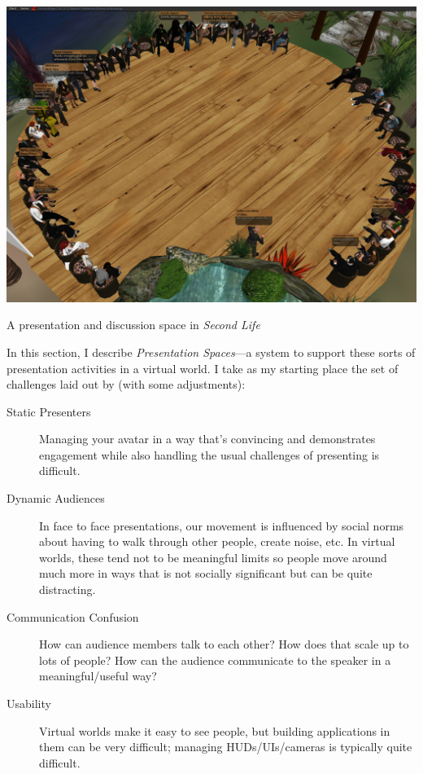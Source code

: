 \begin{marginfigure}
	\includegraphics{figures/presentation_2.png}
	\caption{A presentation and discussion space in \emph{Second Life}}
	\label{fig:circle_presentation}
\end{marginfigure}

In this section, I describe \emph{Presentation Spaces}---a system to support these sorts of presentation activities in a virtual world. I take as my starting place the set of challenges laid out by \citet{Yankelovich:2008vk} (with some adjustments):

\begin{description}
\item[Static Presenters]{Managing your avatar in a way that's convincing and demonstrates engagement while also handling the usual challenges of presenting is difficult.}
\item[Dynamic Audiences]{In face to face presentations, our movement is influenced by social norms about having to walk through other people, create noise, etc. In virtual worlds, these tend not to be meaningful limits so people move around much more in ways that is not socially significant but can be quite distracting.}
\item[Communication Confusion]{How can audience members talk to each other? How does that scale up to lots of people? How can the audience communicate to the speaker in a meaningful/useful way?}
\item[Usability]{Virtual worlds make it easy to see people, but building applications in them can be very difficult; managing HUDs/UIs/cameras is typically quite difficult.}
\end{description}

